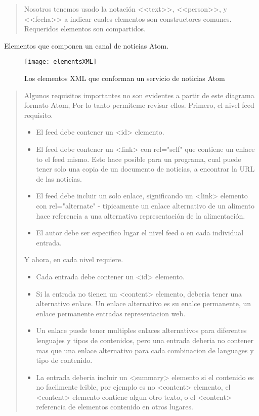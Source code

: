 \scriptsize

\blockquote{

Nosotros tenemos usado la notación <<text>>, <<person>>, y <<fecha>> a indicar cuales elementos son constructores
comunes. Requeridos elementos son compartidos.
}

\normalsize

Elementos que componen un canal de noticias Atom.

\begin{figure}[!ht]
\centering
\texttt{[image: elementsXML]}
\caption{Los elementos XML que conforman un servicio de noticias Atom}
\end{figure}

\scriptsize

\blockquote{

Algunos requisitos importantes no son evidentes a partir de este diagrama formato Atom, Por lo tanto permiteme
revisar ellos. Primero, el nivel feed requisito.

\begin{itemize}

\item El feed debe contener un <id> elemento.
\item El feed debe contener un <link> con rel="self" que contiene un enlace to el feed mismo. Esto hace posible para
un programa, cual puede tener solo una copia de un documento de noticias, a encontrar la URL de las noticias.
\item El feed debe incluir un solo enlace, significando un <link> elemento con rel="alternate" - tipicamente un enlace
alternativo de un alimento hace referencia a una alternativa representación de la alimentación.
\item El autor debe ser especifico lugar el nivel feed o en cada individual entrada.

\end{itemize}

Y ahora, en cada nivel requiere.

\begin{itemize}

\item Cada entrada debe contener un <id> elemento.
\item Si la entrada no tienen un <content> elemento, deberia tener una alternativo enlace. Un enlace alternativo es su enalce
permanente, un enlace permanente entradas representacion web.
\item Un enlace puede tener multiples enlaces alternativos para diferentes lenguajes y tipos de contenidos, pero una entrada
deberia no contener mas que una enlace alternativo para cada combinacion de languages y tipo de contenido.
\item La entrada deberia incluir un <summary> elemento si el contenido es no facilmente leible, por ejemplo es no <content> 
elemento, el <content> elemento contiene algun otro texto, o el <content> referencia de elementos contenido en otros lugares.\cite{johnson2006rss}

\end{itemize}

}

